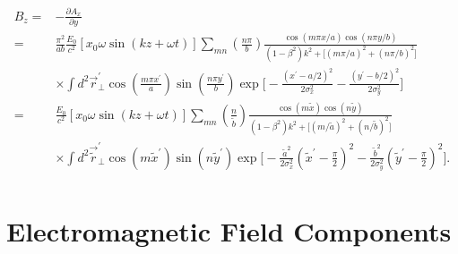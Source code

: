 \documentclass[11pt,oneside]{article}
\begin{document}
\begin{equation}
\begin{split}
  B_{z} = & - \frac{ \partial A_{x} }{ \partial y } \\
= & \frac{\pi^{2}}{ab} \frac{E_{0}}{c^{2}}
    \left[ x_{0} \omega \sin(kz+\omega t) \right]
    \sum_{mn} \left( \frac{n \pi}{b} \right)
    \frac{\cos \left( m \pi x /a \right) \cos \left( n \pi y /b \right) }
         { \left( 1 - \beta^{2} \right) k^{2}
         + \Big[
           \left( m \pi /a \right)^{2} + \left( n \pi /b \right)^{2}
           \Big] } \\
  & \times
    \int d^{2} \vec{r}_{\perp}^{\prime}
    \cos \left( \frac{ m \pi x^{\prime} }{ a } \right)
    \sin \left( \frac{ n \pi y^{\prime} }{ b } \right)
    \exp \Bigg[
       - \frac{ \left( x^{\prime} - a/2 \right)^{2} }{ 2\sigma_{x}^{2}}
       - \frac{ \left( y^{\prime} - b/2 \right)^{2} }{ 2\sigma_{y}^{2}}
         \Bigg] \\
= & \frac{E_{0}}{c^{2}}
    \left[ x_{0} \omega \sin(kz+\omega t) \right]
    \sum_{mn} \left( \frac{n}{\tilde{b}} \right)
    \frac{\cos \left( m \tilde{x} \right) \cos \left( n \tilde{y} \right) }
         { \left( 1 - \beta^{2} \right) k^{2}
         + \Big[
           \left( m / \tilde{a} \right)^{2} + 
           \left( n / \tilde{b} \right)^{2} 
           \Big] } \\
  & \times
    \int d^{2} \vec{\tilde{r}}_{\perp}^{\prime}
    \cos \left( m \tilde{x}^{\prime} \right)
    \sin \left( n \tilde{y}^{\prime} \right)
    \exp \Bigg[
       - \frac{ \tilde{a}^{2} } { 2\sigma_{x}^{2}}
         \left( \tilde{x}^{\prime} - \frac{\pi}{2} \right)^{2}
       - \frac{ \tilde{b}^{2} } { 2\sigma_{y}^{2}}
         \left( \tilde{y}^{\prime} - \frac{\pi}{2} \right)^{2}
         \Bigg] . \\
\end{split}
\end{equation}


\section{Electromagnetic Field Components}
\end{document}
